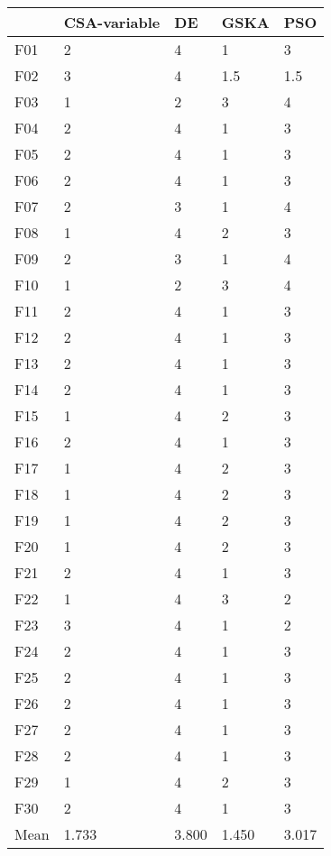 \begin{tabular}{lllll}
\toprule
{} & CSA-variable &     DE &   GSKA &    PSO \\
\midrule
F01  &            2 &      4 &      1 &      3 \\
F02  &            3 &      4 &    1.5 &    1.5 \\
F03  &            1 &      2 &      3 &      4 \\
F04  &            2 &      4 &      1 &      3 \\
F05  &            2 &      4 &      1 &      3 \\
F06  &            2 &      4 &      1 &      3 \\
F07  &            2 &      3 &      1 &      4 \\
F08  &            1 &      4 &      2 &      3 \\
F09  &            2 &      3 &      1 &      4 \\
F10  &            1 &      2 &      3 &      4 \\
F11  &            2 &      4 &      1 &      3 \\
F12  &            2 &      4 &      1 &      3 \\
F13  &            2 &      4 &      1 &      3 \\
F14  &            2 &      4 &      1 &      3 \\
F15  &            1 &      4 &      2 &      3 \\
F16  &            2 &      4 &      1 &      3 \\
F17  &            1 &      4 &      2 &      3 \\
F18  &            1 &      4 &      2 &      3 \\
F19  &            1 &      4 &      2 &      3 \\
F20  &            1 &      4 &      2 &      3 \\
F21  &            2 &      4 &      1 &      3 \\
F22  &            1 &      4 &      3 &      2 \\
F23  &            3 &      4 &      1 &      2 \\
F24  &            2 &      4 &      1 &      3 \\
F25  &            2 &      4 &      1 &      3 \\
F26  &            2 &      4 &      1 &      3 \\
F27  &            2 &      4 &      1 &      3 \\
F28  &            2 &      4 &      1 &      3 \\
F29  &            1 &      4 &      2 &      3 \\
F30  &            2 &      4 &      1 &      3 \\
Mean &        1.733 &  3.800 &  1.450 &  3.017 \\
\bottomrule
\end{tabular}
